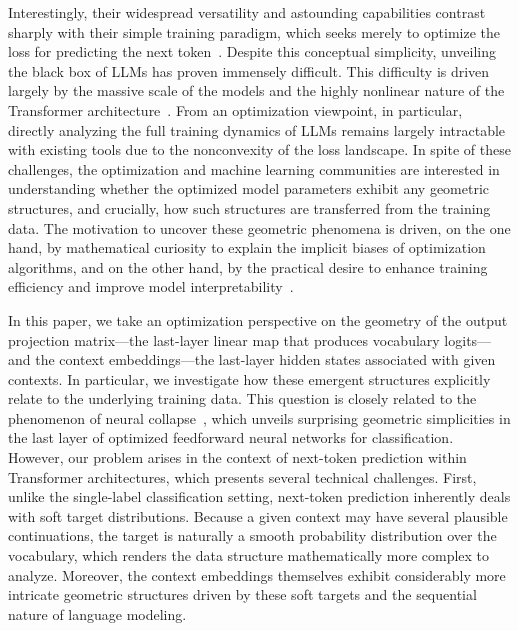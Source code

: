 \documentclass[11pt]{article}
\begin{document}
Interestingly, their widespread versatility and astounding capabilities contrast sharply with their simple training paradigm, which seeks merely to optimize the loss for predicting the next token~\citep{radford2018improving}. Despite this conceptual simplicity, unveiling the black box of LLMs has proven immensely difficult. This difficulty is driven largely by the massive scale of the models and the highly nonlinear nature of the Transformer architecture~\citep{vaswani2017attention}. From an optimization viewpoint, in particular, directly analyzing the full training dynamics of LLMs remains largely intractable with existing tools due to the nonconvexity of the loss landscape. In spite of these challenges, the optimization and machine learning communities are interested in understanding whether the optimized model parameters exhibit any geometric structures, and crucially, how such structures are transferred from the training data. The motivation to uncover these geometric phenomena is driven, on the one hand, by mathematical curiosity to explain the implicit biases of optimization algorithms, and on the other hand, by the practical desire to enhance training efficiency and improve model interpretability~\citep{soudry2018implicit,kaplan2020scaling,hoffmann2022training,elhage2021mathematical,zou2023representation}.

In this paper, we take an optimization perspective on the geometry of the output projection matrix---the last-layer linear map that produces vocabulary logits---and the context embeddings---the last-layer hidden states associated with given contexts. In particular, we investigate how these emergent structures explicitly relate to the underlying training data. This
question is closely related to the phenomenon of neural collapse~\citep{papyan2020prevalence}, which unveils surprising geometric simplicities in the last layer of optimized feedforward neural networks for classification. However, our problem arises in the context of next-token prediction within Transformer architectures, which presents several technical challenges. First, unlike the single-label classification setting, next-token prediction inherently deals with soft target distributions. Because a given context may have several plausible continuations, the target is naturally a smooth probability distribution over the vocabulary, which renders the data structure mathematically more complex to analyze. Moreover, the context embeddings themselves exhibit considerably more intricate geometric structures driven by these soft targets and the sequential nature of language modeling.
\end{document}
